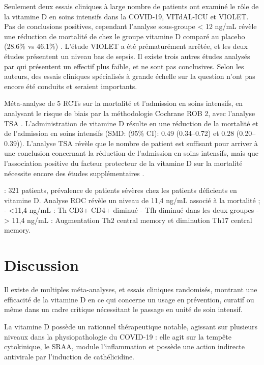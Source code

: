 \documentclass[
  a4paper,
  DIV=11,
  numbers=noendperiod,
  listof=totoc]{scrreprt}
\begin{document}
Seulement deux essais cliniques à large nombre de patients ont examiné
le rôle de la vitamine D en soins intensifs dans la COVID-19, VITdAL-ICU
et VIOLET. Pas de conclusions positives, cependant l'analyse sous-groupe
\textless{} 12 ng/mL révèle une réduction de mortalité de chez le groupe
vitamine D comparé au placebo (28.6\% vs 46.1\%) \autocite{Cutuli.2024}.
L'étude VIOLET a été prématurément arrêtée, et les deux études
présentent un niveau bas de sepsis. Il existe trois autres études
analysés par \textcite{Cutuli.2024} qui présentent un effectif plus
faible, et ne sont pas conclusives. Selon les auteurs, des essais
cliniques spécialisés à grande échelle sur la question n'ont pas encore
été conduits et seraient importants.

Méta-analyse de 5 \acp{RCT} sur la mortalité et l'admission en soins
intensifs, en analysant le risque de biais par la méthodologie Cochrane
ROB 2, avec l'analyse \ac{TSA} \autocite{Kang.2021}. L'administration de
vitamine D résulte en une réduction de la mortalité et de l'admission en
soins intensifs (SMD: (95\% CI): 0.49 (0.34--0.72) et 0.28
(0.20--0.39)). L'analyse TSA révèle que le nombre de patient est
suffisant pour arriver à une conclusion concernant la réduction de
l'admission en soins intensifs, mais que l'association positive du
facteur protecteur de la vitamine D sur la mortalité nécessite encore
des études supplémentaires \autocite{Argano.2023}.

\textcite{Karonova.2022.pharmaceuticals}: 321 patients, prévalence de
patients sévères chez les patients déficients en vitamine D. Analyse ROC
révèle un niveau de 11,4 ng/mL associé à la mortalité ; - \textless11,4
ng/mL : Th CD3+ CD4+ diminué - Tfh diminué dans les deux groupes -
\textgreater{} 11,4 ng/mL : Augmentation Th2 central memory et
diminution Th17 central memory.

\section{Discussion}\label{discussion}

\textcite{Grant.2022.nutrients}

Il existe de multiples méta-analyses, et essais cliniques randomisés,
montrant une efficacité de la vitamine D en ce qui concerne un usage en
prévention, curatif ou même dans un cadre critique nécessitant le
passage en unité de soin intensif.

La vitamine D possède un rationnel thérapeutique notable, agissant sur
plusieurs niveaux dans la physiopathologie du COVID-19 : elle agit sur
la tempête cytokinique, le \ac{SRAA}, module l'inflammation et possède
une action indirecte antivirale par l'induction de cathélicidine.
\end{document}
